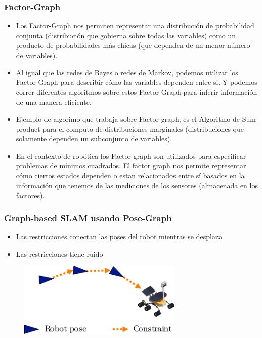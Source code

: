 \begin{frame}
    \frametitle{Factor-Graph}
    
    \begin{itemize}
        \item Los Factor-Graph nos permiten representar una distribución de probabilidad conjunta (distribución que gobierna sobre todas las variables) como un producto de probabilidades más chicas (que dependen de un menor número de variables).
        \item Al igual que las redes de Bayes o redes de Markov, podemos utilizar los Factor-Graph para describir cómo las variables dependen entre si. Y podemos correr diferentes algoritmos sobre estos Factor-Graph para inferir información de una manera eficiente.
        \item Ejemplo de algorimo que trabaja sobre Factor-graph, es el Algoritmo de Sum-product para el computo de distribuciones marginales (distribuciones que solamente dependen un subconjunto de variables).
        \item En el contexto de robótica los Factor-graph son utilizados para especificar problemas de mínimos cuadrados. El factor graph nos permite representar cómo ciertos estados dependen o estan relacionados entre sí basados en la información que tenemos de las mediciones de los sensores (almacenada en los factores).
    \end{itemize}
    
    
\end{frame}

\begin{frame}
    \frametitle{Graph-based SLAM usando Pose-Graph}
    
    \begin{itemize}
        \item Las restricciones conectan las poses del robot mientras se desplaza
        \item Las restricciones tiene ruido
    \end{itemize}

    \begin{figure}[!h]
        \includegraphics[width=0.7\textwidth]{images/pose_graph_example.pdf}
    \end{figure}
    
\end{frame}


